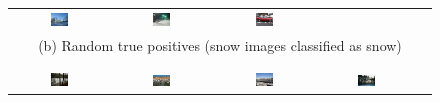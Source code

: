 \begin{figure}[th]
{{\begin{center}
\begin{tabular}{@{}c@{\,\,\,}c@{\,\,\,}c@{\,\,\,}c@{\,\,\,}c@{\,\,\,}}
\includegraphics[width=0.19\textwidth]{figs/tp6.jpg} &
\includegraphics[width=0.19\textwidth]{figs/tp7.jpg} &
\includegraphics[width=0.19\textwidth]{figs/tp9.jpg} \\
\multicolumn{5}{c}{(b) Random true positives (snow images classified as snow)} \\ 
\\[-6pt]
\hline
\\[-6pt]
\includegraphics[width=0.19\textwidth]{figs/fp1.jpg} &
\includegraphics[width=0.19\textwidth]{figs/fp3.jpg} &
\includegraphics[width=0.19\textwidth]{figs/fp5.jpg} &
\includegraphics[width=0.19\textwidth]{figs/fp7.jpg} &

\end{tabular}
\end{center}}}
\end{figure}
